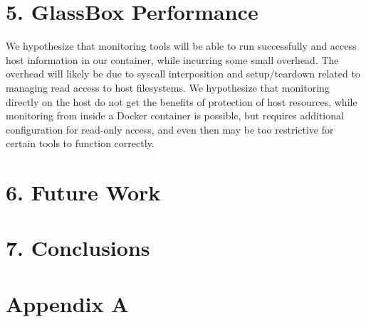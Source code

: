 \documentclass{proc}
\begin{document}
\section*{5. GlassBox Performance}


We hypothesize that monitoring tools will be able to run successfully and access host information in our container, while incurring some small overhead. The overhead will likely be due to syscall interposition and setup/teardown related to managing read access to host filesystems. We hypothesize that monitoring directly on the host do not get the benefits of protection of host resources, while monitoring from inside a Docker container is possible, but requires additional configuration for read-only access, and even then may be too restrictive for certain tools to function correctly.

\section*{6. Future Work}


\section*{7. Conclusions}





\clearpage

\section*{Appendix A}

\end{document}
